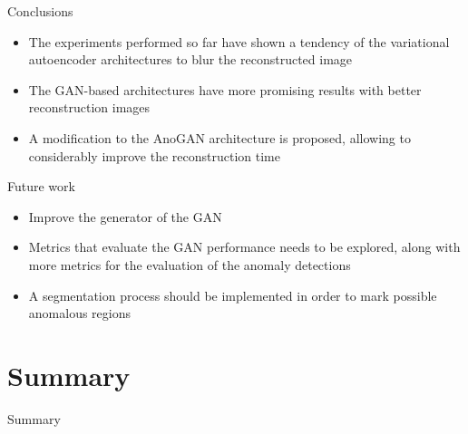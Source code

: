 \documentclass[15pt]{beamer} %
\begin{document}
\begin{frame}{Conclusions}
  
  \begin{itemize}
  \item The experiments performed so far have shown a tendency of the variational autoencoder
architectures to blur the reconstructed image
  \item  The GAN-based architectures have more
promising results with better reconstruction images
  \item A modification to the AnoGAN architecture is proposed, allowing to considerably improve
the reconstruction time
  \end{itemize}
  
\end{frame}

\begin{frame}{Future work}
  
  \begin{itemize}
  \item Improve the generator of the GAN
  \item Metrics that evaluate the GAN performance needs to be explored, along with more metrics for the evaluation of the anomaly detections
  \item A segmentation process should be implemented in order to mark possible anomalous regions
  \end{itemize}
  
\end{frame}


\section{Summary}

\begin{frame}{Summary}
  \tableofcontents
\end{frame}
\end{document}
